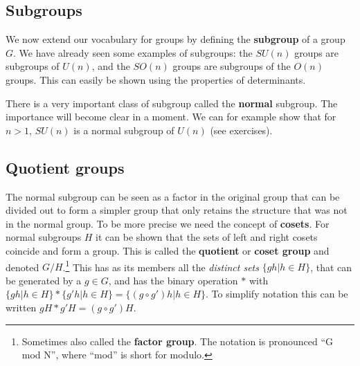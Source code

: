 \documentclass[notes.tex]{subfiles}
\begin{document}
\subsection{Subgroups}
We now extend our vocabulary for groups by defining the {\bf subgroup} of a group $G$.
We have already seen some examples of subgroups: the $SU(n)$ groups are subgroups of $U(n)$, and the $SO(n)$ groups are subgroups of the $O(n)$ groups. This can easily be shown using the properties of determinants.

There is a very important class of subgroup called the {\bf normal} subgroup. The importance will become clear in a moment.
We can for example show that for $n>1$, $SU(n)$ is a normal subgroup of $U(n)$ (see exercises). 

\subsection{Quotient groups}
The normal subgroup can be seen as a factor in the original group that can be divided out to form a simpler group that only retains the structure that was not in the normal group. To be more precise we need the concept of {\bf cosets}. 
For normal subgroups $H$ it can be shown that the sets of left and right cosets coincide and form a group. This is called the {\bf quotient}  or {\bf coset group} and denoted $G/H$.\footnote{Sometimes also called the {\bf factor group}. The notation is pronounced ``G mod N'', where ``mod'' is short for modulo.}
This has as its members all the {\it distinct sets} $\{gh|h\in H\}$, that can be generated by a $g\in G$, and has the binary operation $*$ with $\{gh|h\in H\}*\{g'h|h\in H\}=\{ (g\circ g')h| h\in H\}$. To simplify notation this can be written $gH*g'H=(g\circ g') H$. 
 
\end{document}
